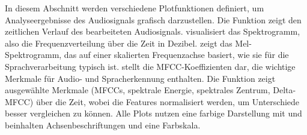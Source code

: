 In diesem Abschnitt werden verschiedene Plotfunktionen definiert, um Analyseergebnisse des Audiosignals grafisch darzustellen. Die Funktion  zeigt den zeitlichen Verlauf des bearbeiteten Audiosignals.  visualisiert das Spektrogramm, also die Frequenzverteilung über die Zeit in Dezibel.  zeigt das Mel-Spektrogramm, das auf einer skalierten Frequenzachse basiert, wie sie für die Sprachverarbeitung typisch ist.  stellt die MFCC-Koeffizienten dar, die wichtige Merkmale für Audio- und Spracherkennung enthalten. Die Funktion  zeigt ausgewählte Merkmale (MFCCs, spektrale Energie, spektrales Zentrum, Delta-MFCC) über die Zeit, wobei die Features normalisiert werden, um Unterschiede besser vergleichen zu können. Alle Plots nutzen eine farbige Darstellung mit  und beinhalten Achsenbeschriftungen und eine Farbskala. \cite{Hossain:2025} \cite{MathWorks:2025Plots} \cite{MathWorks:2025CategoricalPlot}

